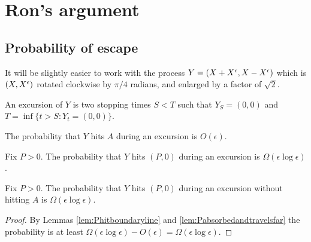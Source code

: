 {
\section{Ron's argument}

\newcommand{\bandwidth}{\delta}
\newcommand{\rotproc}{Y}

\newcommand{\union}{\cup}
\renewcommand{\L}{L^+ \union L^-}
\newcommand{\Le}{L^\epsilon}

\subsection{Probability of escape}

It will be slightly easier to work with the process $\rotproc =
(\sampled + \resamplede, \sampled - \resamplede)$ which is $(X,
X^{\epsilon})$ rotated clockwise by $\pi / 4$ radians, and enlarged by a factor of
$\sqrt{2}$.

\newcommand{\boundarylines}{A}

\begin{definition}
  An excursion of $Y$ is two stopping times $S < T$ such that $Y_S =
  (0,0)$ and $T = \inf\{ t > S : Y_t = (0,0) \}$.  
\end{definition}

\begin{lemma}
  \label{lem:Phitboundaryline}
  The probability that $Y$ hits $\boundarylines$ during an excursion
  is $O(\epsilon)$.
\end{lemma}

\newcommand{\Omegaeloge}{\Omega(\epsilon\log\epsilon)}

\begin{lemma}
  \label{lem:Pabsorbedandtravelsfar}
  Fix $P > 0$.  The probability that $Y$ hits $(P,0)$ during an
  excursion is $\Omegaeloge$.
\end{lemma}

\begin{lemma}
  Fix $P > 0$.  The probability that $Y$ hits $(P,0)$ during an
  excursion without hitting $A$ is $\Omegaeloge$.
\end{lemma}

\begin{proof}
  By Lemmas \ref{lem:Phitboundaryline} and
  \ref{lem:Pabsorbedandtravelsfar} the probability is at least
  $\Omegaeloge - O(\epsilon) = \Omegaeloge$.
\end{proof}

}
